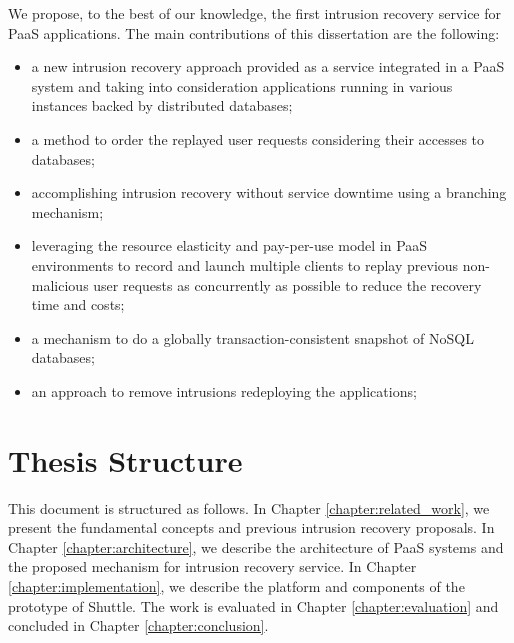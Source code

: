 We propose, to the best of our knowledge, the first intrusion recovery service for \ac{PaaS} applications. The main contributions of this dissertation are the following:
\begin{itemize}
\item a new intrusion recovery approach provided as a service integrated in a \ac{PaaS} system and taking into consideration applications running in various instances backed by distributed databases;
\item a method to order the replayed user requests considering their accesses to databases;
\item accomplishing intrusion recovery without service downtime using a branching mechanism;
\item leveraging the resource elasticity and pay-per-use model in \ac{PaaS} environments to record and launch multiple clients to replay previous non-malicious user requests as concurrently as possible to reduce the recovery time and costs;
\item a mechanism to do a globally transaction-consistent snapshot of \acs{NoSQL} databases;
\item an approach to remove intrusions redeploying the applications;
\end{itemize}

\section{Thesis Structure}\label{sec:introduction:structure}
This document is structured as follows. In Chapter \ref{chapter:related_work}, we present the fundamental concepts and previous intrusion recovery proposals. In Chapter \ref{chapter:architecture}, we describe the architecture of \ac{PaaS} systems and the proposed mechanism for intrusion recovery service. In Chapter \ref{chapter:implementation}, we describe the platform and components of the prototype of Shuttle. The work is evaluated in Chapter \ref{chapter:evaluation} and concluded in Chapter \ref{chapter:conclusion}.